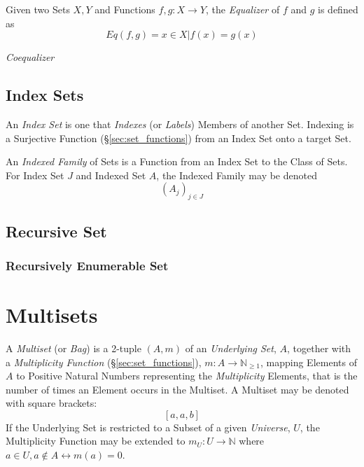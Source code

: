 \documentclass{article}
\begin{document}
Given two Sets $X,Y$ and Functions $f,g : X \rightarrow Y$, the
\emph{Equalizer} of $f$ and $g$ is defined as
\[
    Eq(f,g) = { x \in X | f(x) = g(x) }
\]

\emph{Coequalizer}

\subsection{Index Sets}\label{subsec:index_set}

An \emph{Index Set} is one that \emph{Indexes} (or \emph{Labels})
Members of another Set. Indexing is a Surjective Function
(\S\ref{sec:set_functions}) from an Index Set onto a target Set.

An \emph{Indexed Family} of Sets is a Function from an Index Set to
the Class of Sets. For Index Set $J$ and Indexed Set $A$, the Indexed
Family may be denoted
\[
    (A_j)_{j \in J}
\]

\subsection{Recursive Set}\label{subsec:recursive_set}

\subsubsection{Recursively Enumerable Set}\label{subsec:recursively_enumerable}

\section{Multisets}\label{sec:multi_sets}

A \emph{Multiset} (or \emph{Bag}) is a 2-tuple $(A,m)$ of an
\emph{Underlying Set}, $A$, together with a \emph{Multiplicity
  Function} (\S\ref{sec:set_functions}), $m : A \rightarrow
\mathbb{N}_{\geq 1}$, mapping Elements of $A$ to Positive Natural
Numbers representing the \emph{Multiplicity} Elements, that is the
number of times an Element occurs in the Multiset. A Multiset may be
denoted with square brackets:
\[
    [a,a,b]
\]
If the Underlying Set is restricted to a Subset of a given
\emph{Universe}, $U$, the Multiplicity Function may be extended to
$m_U : U \rightarrow \mathbb{N}$ where $a \in U, a \notin A
\leftrightarrow m(a)=0$.
\end{document}
